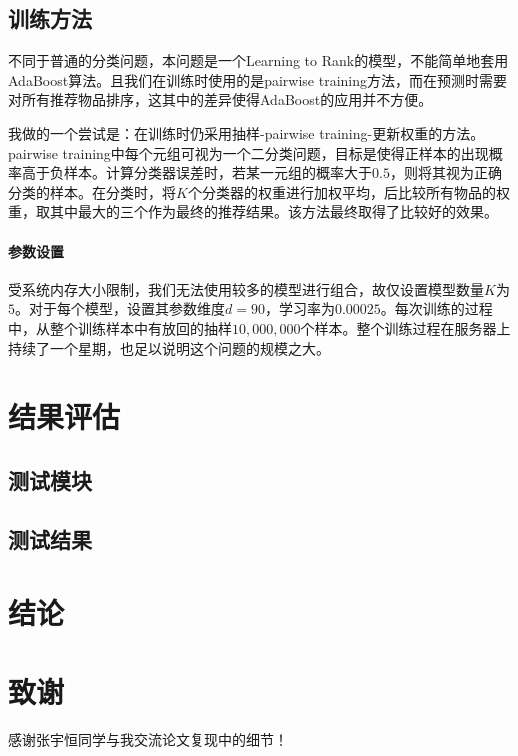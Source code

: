 \documentclass[12pt]{article} %
\begin{document}
\begin{sloppypar}
\subsection{训练方法}

不同于普通的分类问题，本问题是一个Learning to Rank的模型，不能简单地套用AdaBoost算法。且我们在训练时使用的是pairwise training方法，而在预测时需要对所有推荐物品排序，这其中的差异使得AdaBoost的应用并不方便。

我做的一个尝试是：在训练时仍采用抽样-pairwise training-更新权重的方法。pairwise training中每个元组可视为一个二分类问题，目标是使得正样本的出现概率高于负样本。计算分类器误差时，若某一元组的概率大于$0.5$，则将其视为正确分类的样本。在分类时，将$K$个分类器的权重进行加权平均，后比较所有物品的权重，取其中最大的三个作为最终的推荐结果。该方法最终取得了比较好的效果。

\paragraph{参数设置}
受系统内存大小限制，我们无法使用较多的模型进行组合，故仅设置模型数量$K$为$5$。对于每个模型，设置其参数维度$d=90$，学习率为$0.00025$。每次训练的过程中，从整个训练样本中有放回的抽样$10,000,000$个样本。整个训练过程在服务器上持续了一个星期，也足以说明这个问题的规模之大。


\newpage
\section{结果评估}

\subsection{测试模块}

\subsection{测试结果}

\newpage
\section{结论}



\newpage
 



\section*{致谢}


感谢张宇恒同学与我交流论文复现中的细节！


\end{sloppypar}
\end{document}
